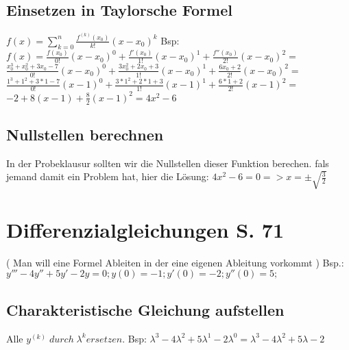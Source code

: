 \documentclass[a4paper, 11pt]{article}
\begin{document}
\subsection {Einsetzen in Taylorsche Formel}

$ f(x) = \sum_{k=0}^n \frac {f^{(k)}(x_0)}{k!}(x - x_0)^k$\newline
\newline Bsp:\newline				
$f(x) = \frac {f(x_0)}{0!} (x - x_0)^0 + \frac {f'(x_0)}{1!} (x - x_0)^1 + \frac {f''(x_0)}{2!} (x - x_0)^2 =$\newline
\newline $\frac {x_0^3 + x_0^2 + 3x_0 - 7}{0!} (x - x_0)^0 + \frac {3x_0^2 + 2x_0 + 3}{1!} (x - x_0)^1 + \frac {6x_0 + 2}{2!} (x - x_0)^2 = $\newline
\newline $\frac {1^3 + 1^2 + 3 * 1 - 7}{0!} (x - 1)^0 + \frac {3 *1^2 + 2*1 + 3}{1!} (x - 1)^1 + \frac {6 * 1 + 2}{2!} (x - 1)^2 = $\newline
\newline $-2+8(x-1)+\frac 8 2 (x-1)^2 = 4x^2 - 6$

\subsection {Nullstellen berechnen}

In der Probeklausur sollten wir die Nullstellen dieser Funktion berechen. \newline
fals jemand damit ein Problem hat, hier die Lösung: \newline
\newline $ 4x^2 - 6 = 0 => x= \pm \sqrt {\frac 3 2}$  

\section {Differenzialgleichungen S. 71}

( Man will eine Formel Ableiten in der eine eigenen Ableitung vorkommt )\newline
\newline Bsp.: $ y''' - 4y'' +5y' -2y = 0 ; y(0) = -1; y'(0) = -2; y''(0) = 5;$

\subsection { Charakteristische Gleichung aufstellen} 
Alle $y^{(k)}\; durch \; \lambda^k ersetzen.$\newline
\newline Bsp: $ \lambda^3 - 4 \lambda^2 + 5 \lambda^1 - 2\lambda^0 = \lambda^3 - 4 \lambda^2 + 5 \lambda - 2$
\end{document}
